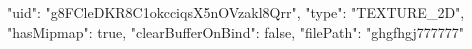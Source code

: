 {
    "uid": "g8FCleDKR8C1okcciqsX5nOVzakl8Qrr",
    "type": "TEXTURE_2D",
    "hasMipmap": true,
    "clearBufferOnBind": false,
    "filePath": "ghgfhgj777777"
}